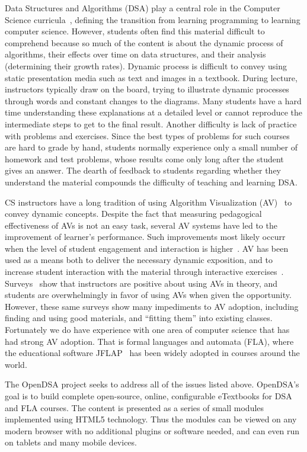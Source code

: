\documentclass[11pt]{article}
\begin{document}
Data Structures and Algorithms (DSA) play a central role in
the Computer Science curricula~\cite{CS2013},
defining the transition from learning programming to learning computer
science.
However, students often find this material difficult to
comprehend because so much of the content is about the dynamic process
of algorithms, their effects over time on data structures, and their
analysis (determining their growth rates).
Dynamic process is difficult to convey using static
presentation media such as text and images in a textbook.
During lecture, instructors typically draw on the board,
trying to illustrate dynamic processes through words and constant
changes to the diagrams.
Many students have a hard time understanding these explanations at a
detailed level or cannot reproduce the intermediate steps to
get to the final result.
Another difficulty is lack of practice with problems and exercises.
Since the best types of problems for such courses are hard to grade by
hand, students normally experience only a small number of
homework and test problems, whose results come only long after the
student gives an answer.
The dearth of feedback to students regarding whether they understand
the material compounds the difficulty of teaching and learning DSA.

CS instructors have a long tradition of using Algorithm Visualization
(AV)~\cite{NapsPanelShort,Shaffer10,Fouh:AV11}
to convey dynamic concepts.
Despite the fact that measuring pedagogical effectiveness of AVs is
not an easy task, several AV systems have led
to the improvement of learner's performance.
Such improvements most likely occurr when the level of student
engagement and interaction is
higher~\cite{MetaStudy,urquiza09,Fouh:AV11}.
AV has been used as a means both to deliver the necessary dynamic
exposition, and to increase student interaction with 
the material through interactive exercises~\cite{Malmi04}.
Surveys~\cite{NapsPanelShort,ShafferSIGCSE11} show that
instructors are positive about using AVs in theory, and students are
overwhelmingly in favor of using AVs when given the opportunity.
However, these same surveys show many impediments to AV adoption,
including finding and using good materials, and ``fitting them'' into
existing classes.
Fortunately we do have experience with one area of computer science
that has had strong AV adoption.
That is formal languages and automata (FLA), where the educational
software JFLAP~\cite{JFLAPsite} has been widely adopted in
courses around the world.

The OpenDSA project seeks to address all of the issues listed above.
OpenDSA's goal is to build complete open-source, online, configurable
eTextbooks for DSA and FLA courses.
The content is presented as a series of small modules implemented
using HTML5 technology.
Thus the modules can be viewed on any modern browser with no
additional plugins or software needed, and can even run on 
tablets and many mobile devices.
\end{document}
